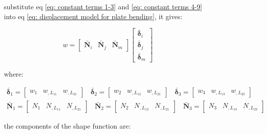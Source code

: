 \begin{figure}[h!]
substitute eq \ref{eq: constant terms 1-3} and \ref{eq: constant terms 4-9} into eq \ref{eq: displacement model for plate bending}, it gives:

\begin{equation} \label{eq: nodal displacements definition}
w = \begin{bmatrix}
\bar{\mathbf{N}}_i & \bar{\mathbf{N}}_j & \bar{\mathbf{N}}_m
\end{bmatrix}
 \begin{bmatrix}
 \bar{\mathbf{\delta}}_i \\ 
 \bar{\mathbf{\delta}}_j \\ 
 \bar{\mathbf{\delta}}_m
 \end{bmatrix} 
\end{equation}

where:

\begin{equation*}
	\begin{split}
	\bar{\mathbf{\delta}}_1 = \begin{bmatrix}
		w_1 & w_{,L_{11}} & w_{,L_{21}}
		\end{bmatrix}~~~~\bar{\mathbf{\delta}}_2 = \begin{bmatrix}
		w_2 & w_{,L_{12}} & w_{,L_{21}} \end{bmatrix}~~~~\bar{\mathbf{\delta}}_3 = \begin{bmatrix}	w_3 & w_{,L_{13}} & w_{,L_{23}} \end{bmatrix} \\
		\bar{\mathbf{N}}_1 = \begin{bmatrix}
			N_1 & N_{,L_{11}} & N_{,L_{21}}
		\end{bmatrix}~~~~\bar{\mathbf{N}}_2 = \begin{bmatrix}
		N_2 & N_{,L_{12}} & N_{,L_{21}} \end{bmatrix}~~~~\bar{\mathbf{N}}_3 = \begin{bmatrix}	N_3 & N_{,L_{13}} & N_{,L_{23}} \end{bmatrix}
	\end{split}	
\end{equation*}

the components of the shape function are:


\end{figure}
